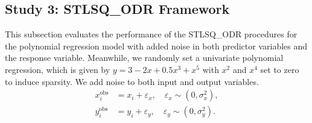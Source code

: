 \subsection{Study 3: STLSQ\_ODR Framework}
\label{subsec:study2}
This subsection evaluates the performance of the STLSQ\_ODR procedures for the polynomial regression model with added noise in both predictor variables and the response variable. 
Meanwhile, we randomly set a univariate polynomial regression, which is given by $y = 3 - 2x + 0.5x^3 + x^5$ with $x^2$ and $x^4$ set to zero to induce sparsity. 
We add noise to both input and output variables.
\begin{align*}
x_i^{\text{obs}} &= x_i + \varepsilon_x, \quad \varepsilon_x \sim (0, \sigma_x^2), \\
y_i^{\text{obs}} &= y_i + \varepsilon_y, \quad \varepsilon_y \sim (0, \sigma_y^2).
\end{align*}

